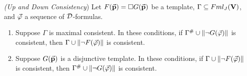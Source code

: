 \begin{pro}\textit{(Up and Down Consistency})
	Let $F(\vec{\textbf{p}}) = \Box G(\vec{\textbf{p}})$ be a template, $\Gamma \subseteq Fml_{J}(\textbf{V})$,  and $\vec{\varphi}$ a sequence of $\mathcal{D}$-formulas.
	
	\begin{enumerate}[1)]
		\item Suppose $\Gamma$ is maximal consistent. In these conditions, if $\Gamma^{\#} \cup \Arrowvert \neg G(\vec{\varphi}) \Arrowvert$ is consistent, then  $\Gamma \cup \Arrowvert \neg F(\vec{\varphi}) \Arrowvert$ is consistent.
		\item Suppose $G(\vec{\textbf{p}})$ is a disjunctive template. In these conditions,  if $\Gamma \cup \Arrowvert \neg F(\vec{\varphi}) \Arrowvert$ is consistent, then  $\Gamma^{\#} \cup \Arrowvert \neg G(\vec{\varphi}) \Arrowvert$ is consistent.
	\end{enumerate}    
\end{pro}

